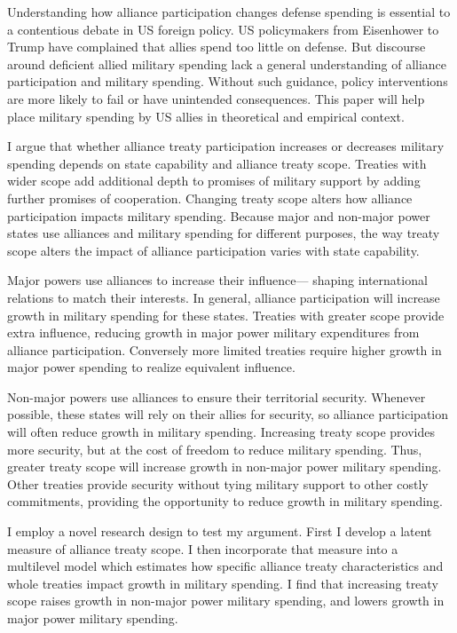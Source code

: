 \documentclass[12pt]{article}
\begin{document}
Understanding how alliance participation changes defense spending is essential to a contentious debate in US foreign policy. 
US policymakers from Eisenhower to Trump have complained that allies spend too little on defense.  
But discourse around deficient allied military spending lack a general understanding of alliance participation and military spending. 
Without such guidance, policy interventions are more likely to fail or have unintended consequences. 
This paper will help place military spending by US allies in theoretical and empirical context.


I argue that whether alliance treaty participation increases or decreases military spending depends on state capability and alliance treaty scope. 
Treaties with wider scope add additional depth to promises of military support by adding further promises of cooperation. 
Changing treaty scope alters how alliance participation impacts military spending. 
Because major and non-major power states use alliances and military spending for different purposes, the way treaty scope alters the impact of alliance participation varies with state capability. 


Major powers use alliances to increase their influence--- shaping international relations to match their interests.
In general, alliance participation will increase growth in military spending for these states.  
Treaties with greater scope provide extra influence, reducing growth in major power military expenditures from alliance participation. 
Conversely more limited treaties require higher growth in major power spending to realize equivalent influence. 


Non-major powers use alliances to ensure their territorial security.
Whenever possible, these states will rely on their allies for security, so alliance participation will often reduce growth in military spending.   
Increasing treaty scope provides more security, but at the cost of freedom to reduce military spending. 
Thus, greater treaty scope will increase growth in non-major power military spending. 
Other treaties provide security without tying military support to other costly commitments, providing the opportunity to reduce growth in military spending. 


I employ a novel research design to test my argument.
First I develop a latent measure of alliance treaty scope. 
I then incorporate that measure into a multilevel model which estimates how specific alliance treaty characteristics and whole treaties impact growth in military spending.
I find that increasing treaty scope raises growth in non-major power military spending, and lowers growth in major power military spending. 
\end{document}

